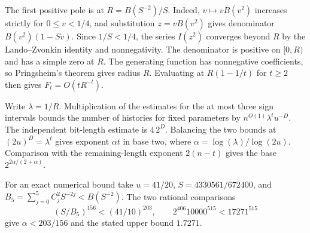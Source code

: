 The first positive pole is at \(R=B(S^{-2})/S\). Indeed,
\(v\mapsto vB(v^2)\) increases strictly for \(0\le v<1/4\),
and substitution \(z=vB(v^2)\) gives denominator
\(B(v^2)(1-Sv)\). Since \(1/S<1/4\), the series \(I(z^2)\)
converges beyond \(R\) by the Lando--Zvonkin identity and
nonnegativity. The denominator is positive on \([0,R)\) and has a
simple zero at \(R\). The generating function has nonnegative
coefficients, so Pringsheim's theorem gives radius \(R\). Evaluating
at \(R(1-1/t)\) for \(t\ge2\) then gives \(F_t=O(tR^{-t})\).

Write \(\lambda=1/R\). Multiplication of the estimates for the at
most three sign intervals bounds the number of histories for fixed
parameters by \(n^{O(1)}\lambda^t u^{-D}\). The independent
bit-length estimate is \(4\,2^D\). Balancing the two bounds at
\((2u)^D=\lambda^t\) gives exponent \(\alpha t\) in base two,
where \(\alpha=\log(\lambda)/\log(2u)\). Comparison with the
remaining-length exponent \(2(n-t)\) gives the base
\(2^{2\alpha/(2+\alpha)}\).

For an exact numerical bound take \(u=41/20\),
\(S=4330561/672400\), and
\(B_5=\sum_{j=0}^5 C_j^2S^{-2j}<B(S^{-2})\).
The two rational comparisons
\[
 (S/B_5)^{156}<(41/10)^{203},\qquad
 2^{406}10000^{515}<17271^{515}
\]
give \(\alpha<203/156\) and the stated upper bound \(1.7271\).

